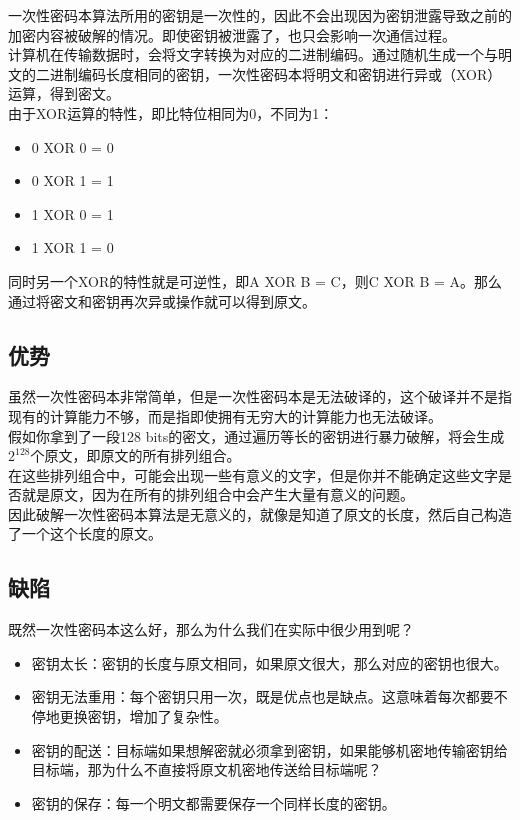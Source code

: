 一次性密码本算法所用的密钥是一次性的，因此不会出现因为密钥泄露导致之前的加密内容被破解的情况。即使密钥被泄露了，也只会影响一次通信过程。\\

计算机在传输数据时，会将文字转换为对应的二进制编码。通过随机生成一个与明文的二进制编码长度相同的密钥，一次性密码本将明文和密钥进行异或（XOR）运算，得到密文。\\

由于XOR运算的特性，即比特位相同为0，不同为1：

\begin{itemize}
    \item 0 XOR 0 = 0
    \item 0 XOR 1 = 1
    \item 1 XOR 0 = 1
    \item 1 XOR 1 = 0
\end{itemize}

同时另一个XOR的特性就是可逆性，即A XOR B = C，则C XOR B = A。那么通过将密文和密钥再次异或操作就可以得到原文。\\

\subsection{优势}

虽然一次性密码本非常简单，但是一次性密码本是无法破译的，这个破译并不是指现有的计算能力不够，而是指即使拥有无穷大的计算能力也无法破译。\\

假如你拿到了一段128 bits的密文，通过遍历等长的密钥进行暴力破解，将会生成$ 2^{128} $个原文，即原文的所有排列组合。\\

在这些排列组合中，可能会出现一些有意义的文字，但是你并不能确定这些文字是否就是原文，因为在所有的排列组合中会产生大量有意义的问题。\\

因此破解一次性密码本算法是无意义的，就像是知道了原文的长度，然后自己构造了一个这个长度的原文。\\

\subsection{缺陷}

既然一次性密码本这么好，那么为什么我们在实际中很少用到呢？

\begin{itemize}
    \item 密钥太长：密钥的长度与原文相同，如果原文很大，那么对应的密钥也很大。

    \item 密钥无法重用：每个密钥只用一次，既是优点也是缺点。这意味着每次都要不停地更换密钥，增加了复杂性。

    \item 密钥的配送：目标端如果想解密就必须拿到密钥，如果能够机密地传输密钥给目标端，那为什么不直接将原文机密地传送给目标端呢？

    \item 密钥的保存：每一个明文都需要保存一个同样长度的密钥。
\end{itemize}

